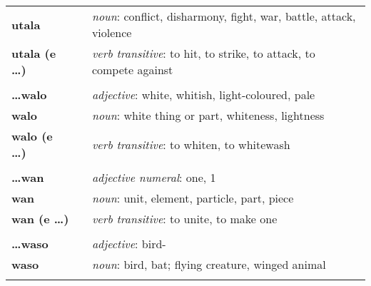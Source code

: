 \begin{supertabular}{p{2,5cm}|ll}
    \textbf{utala}               &  & \textit{noun}: conflict, disharmony, fight, war, battle, attack, violence                                  \\
    \textbf{utala (e \dots)}     &  & \textit{verb transitive}: to hit, to strike, to attack, to compete against                                 \\
                                 &  &                                                                                                            \\ %
    \textbf{\dots walo}          &  & \textit{adjective}: white, whitish, light-coloured, pale                                                   \\
    \textbf{walo}                &  & \textit{noun}: white thing or part, whiteness, lightness                                                   \\
    \textbf{walo (e \dots)}      &  & \textit{verb transitive}: to whiten, to whitewash                                                          \\
                                 &  &                                                                                                            \\ %
    \textbf{\dots wan}           &  & \textit{adjective numeral}: one, 1                                                                         \\
    \textbf{wan}                 &  & \textit{noun}: unit, element, particle, part, piece                                                        \\
    \textbf{wan (e \dots)}       &  & \textit{verb transitive}: to unite, to make one                                                            \\
                                 &  &                                                                                                            \\ %
    \textbf{\dots waso}          &  & \textit{adjective}: bird-                                                                                  \\
    \textbf{waso}                &  & \textit{noun}: bird, bat; flying creature, winged animal                                                   \\
                                 &  &                                                                                                            \\ %

\end{supertabular}
